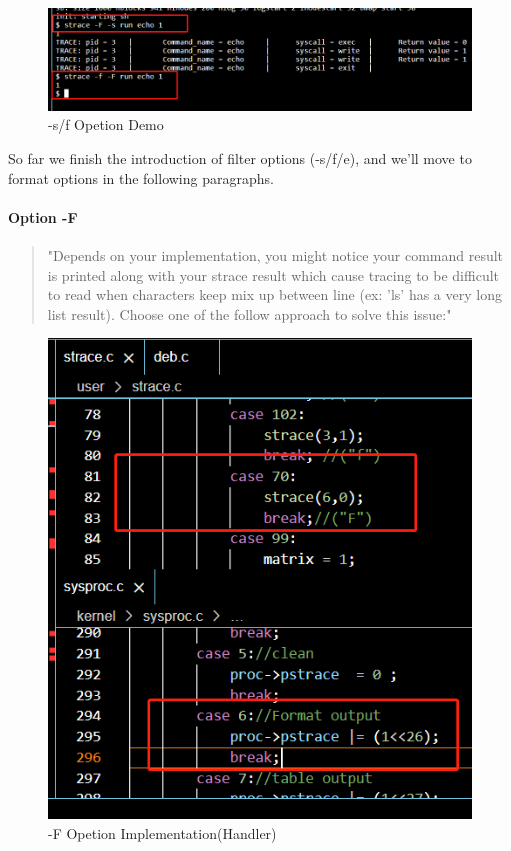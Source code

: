 \documentclass[11pt,oneside,a4paper]{article}
\begin{document}
\begin{figure}[H]
    \includegraphics[width=4.75in]{1-26.png}
    \centering
    \caption{-s/f Opetion Demo}
\end{figure}

So far we finish the introduction of filter options (-s/f/e), and we'll move to format 
options in the following paragraphs.

\paragraph*{Option -F}
\begin{quotation}
    "Depends on your implementation, you might notice your command result is printed along with your
strace result which cause tracing to be difficult to read when characters keep mix up between line
(ex: 'ls' has a very long list result). Choose one of the follow approach to solve this issue:"
\end{quotation}

\begin{figure}[H]
    \includegraphics[width=4.75in]{1-27.png}
    \centering
    \caption{-F Opetion Implementation(Handler)}
\end{figure}
\end{document}
